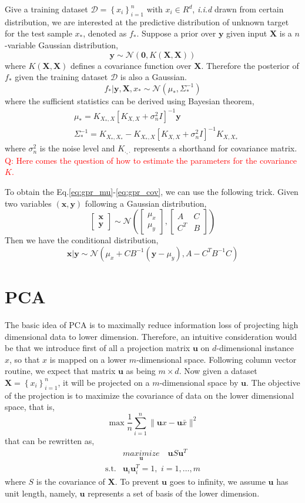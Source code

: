 \documentclass{article}
\newcommand{\vct}[1]{\ensuremath{\boldsymbol{#1}}} %
\newcommand{\set}[1]{\ensuremath{\mathcal{#1}}}
\newcommand{\bmat}[1]{\begin{bmatrix}#1\end{bmatrix}}
\newcommand{\question}[1]{\textcolor{red}{Q: #1}}
\begin{document}
Give a training dataset $\set D = \left\{x_i\right\}_{i=1}^n$ with $x_i \in R^d$, \textit{i.i.d} drawn from certain distribution, we are interested at the predictive distribution of unknown target for the  test sample $x_*$, denoted as $f_*$. Suppose a prior over $\vct y$ given input $\vct X$ is a $n$-variable Gaussian distribution,
\[
\vct y \sim \set N(\vct 0, K(\vct X, \vct X))
\]
where $K(\vct X, \vct X)$ defines a covariance function over $\vct X$. Therefore the posterior of $f_*$ given the training dataset $\set D$ is also a Gaussian.
\[
f_*|\vct y, \vct X, x_* \sim \set N(\mu_*, \Sigma_*^{-1})
\]
where the sufficient statistics can be derived using Bayesian theorem,
\begin{align}
	& \mu_* = K_{X_*,X}\left[K_{X,X}+\sigma_n^2 I\right]^{-1}\vct y \label{eq:gpr_mu}\\
	& \Sigma_*^{-1} = K_{X_*,X_*} - K_{X_*,X}\left[K_{X,X}+\sigma_n^2 I\right]^{-1}K_{X,X_*} \label{eq:gpr_cov}
\end{align}
where $\sigma_n^2$ is the noise level and $K_{\cdot,\cdot}$ represents a shorthand for covariance matrix.
\question{Here comes the question of how to estimate the parameters for the covariance $K$.}

To obtain the Eq.\eqref{eq:gpr_mu}-\eqref{eq:gpr_cov}, we can use the following trick.
Given two variables $(\vct x, \vct y)$ following a Gaussian distribution,
\[
\bmat{\vct x\\ \vct y} \sim \set N\left(
\bmat{\mu_x \\ \mu_y}, \bmat{A & C \\ C^T & B}
\right)
\]
Then we have the conditional distribution,
\[
\vct x|\vct y \sim \set N\left(\mu_x+CB^{-1}(\vct y - \mu_y), A - C^TB^{-1}C \right)
\]

\section{PCA}
The basic idea of PCA is to maximally reduce information loss of projecting high dimensional data to lower dimension. Therefore, an intuitive consideration would be that we introduce first of all a projection matrix $\vct u$ on $d$-dimensional instance $x$, so that $x$ is mapped on a lower $m$-dimensional space. Following column vector routine, we expect that matrix $\vct u$ as being $m \times d$. Now given a dataset $ \vct X = \left\{  x_i\right\}_{i=1}^{n}$, it will be projected on a $ m $-dimensional space by $\vct u$. The objective of the projection is to maximize the covariance of data on the lower dimensional space, that is, 
\[
	\max \dfrac{1}{n}\sum_{i=1}^{n}\|\vct ux - \vct u\bar{x}\|^2 
\]
that can be rewritten as,
\begin{eqnarray}
	& \underset{\vct u}{\textit{maximize}}\quad \vct u S \vct u^T \nonumber \\ 
	\text{s.t.} & \vct u_i\vct u_i^T = 1, \,\, i=1,\ldots,m
	\label{eq:pca_obj}
\end{eqnarray}
where $S$ is the covariance of $\vct X$. To prevent $\vct u$ goes to infinity, we assume $\vct u$ has unit length, namely, $\vct u$ represents a set of basis of the lower dimension. 
\end{document}
